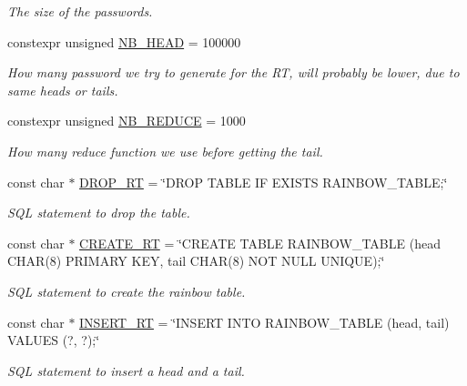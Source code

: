 \begin{DoxyCompactItemize}
\begin{DoxyCompactList}\small\item\em The size of the passwords. \end{DoxyCompactList}\item 
constexpr unsigned \hyperlink{namespacebe_1_1esi_1_1secl_1_1pn_a4315be4236bbf06dd631d0e6dc87fc41}{N\+B\+\_\+\+H\+E\+AD} = 100000
\begin{DoxyCompactList}\small\item\em How many password we try to generate for the RT, will probably be lower, due to same heads or tails. \end{DoxyCompactList}\item 
constexpr unsigned \hyperlink{namespacebe_1_1esi_1_1secl_1_1pn_a712c184235263459041b774c8229fc1b}{N\+B\+\_\+\+R\+E\+D\+U\+CE} = 1000
\begin{DoxyCompactList}\small\item\em How many reduce function we use before getting the tail. \end{DoxyCompactList}\item 
const char $\ast$ \hyperlink{namespacebe_1_1esi_1_1secl_1_1pn_a6dae14cb83aa871e50c9aaea7f776055}{D\+R\+O\+P\+\_\+\+RT} = \char`\"{}D\+R\+OP T\+A\+B\+LE IF E\+X\+I\+S\+TS R\+A\+I\+N\+B\+O\+W\+\_\+\+T\+A\+B\+LE;\char`\"{}
\begin{DoxyCompactList}\small\item\em S\+QL statement to drop the table. \end{DoxyCompactList}\item 
const char $\ast$ \hyperlink{namespacebe_1_1esi_1_1secl_1_1pn_ab39f379fcf2d9342096df70dcf998d32}{C\+R\+E\+A\+T\+E\+\_\+\+RT} = \char`\"{}C\+R\+E\+A\+TE T\+A\+B\+LE R\+A\+I\+N\+B\+O\+W\+\_\+\+T\+A\+B\+LE (head C\+H\+AR(8) P\+R\+I\+M\+A\+RY K\+EY, tail C\+H\+AR(8) N\+OT N\+U\+LL U\+N\+I\+Q\+UE);\char`\"{}
\begin{DoxyCompactList}\small\item\em S\+QL statement to create the rainbow table. \end{DoxyCompactList}\item 
const char $\ast$ \hyperlink{namespacebe_1_1esi_1_1secl_1_1pn_a93b0970fb08c37d478307bfadfb3b775}{I\+N\+S\+E\+R\+T\+\_\+\+RT} = \char`\"{}I\+N\+S\+E\+RT I\+N\+TO R\+A\+I\+N\+B\+O\+W\+\_\+\+T\+A\+B\+LE (head, tail) V\+A\+L\+U\+ES (?, ?);\char`\"{}
\begin{DoxyCompactList}\small\item\em S\+QL statement to insert a head and a tail. \end{DoxyCompactList}\item 

\end{DoxyCompactItemize}
